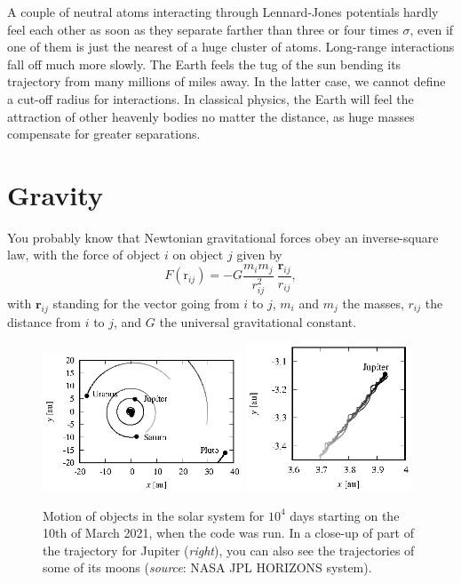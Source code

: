 A couple of neutral atoms interacting through Lennard-Jones potentials hardly 
feel each other as soon as they separate farther than three or four times 
$\sigma$, even if one of them is just the nearest of a huge cluster of atoms. 
Long-range interactions fall off much more slowly. The Earth feels the tug of 
the sun bending its trajectory from many millions of miles away. In the latter 
case, we cannot define a cut-off radius for interactions. In classical physics, 
the Earth will feel the attraction of other heavenly bodies no matter the 
distance, as huge masses compensate for greater separations.

\section{Gravity}

You probably know that Newtonian gravitational forces obey an inverse-square
law, with the force of object $i$ on object $j$ given by
\begin{equation*}
  F(\mathrm{r}_{ij}) = -G \frac{m_i m_j}{r_{ij}^2}\
                          \frac{\mathbf{r}_{ij}}{r_{ij}},
\end{equation*}
with $\mathbf{r}_{ij}$ standing for the vector going from $i$ to $j$, $m_i$ and
$m_j$ the masses, $r_{ij}$ the distance from $i$ to $j$, and $G$ the universal
gravitational constant.

\begin{figure}
  \begin{center}
  \includegraphics[width = 0.53\textwidth]{figures/gravity.eps}
  \includegraphics[width = 0.44\textwidth]{figures/Jupiter.eps}
  \end{center}
  \caption{\label{gravity}Motion of objects in the solar system for $10^4$ days 
           starting on the 10th of March 2021, when the code was run. In a 
           close-up of part of the trajectory for Jupiter (\textit{right}), you 
           can also see the trajectories of some of its moons 
           (\textit{source}: NASA JPL HORIZONS system).}
\end{figure}


